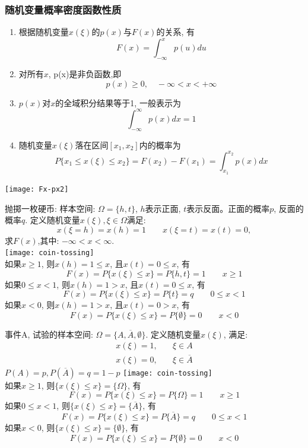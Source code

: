 \begin{frame}[shrink]
\frametitle{随机变量概率密度函数性质}
\begin{enumerate}
	\item 根据随机变量$x(\xi)$的$p(x)$与$F(x)$的关系, 有
	\[F(x)=\int_{-\infty}^{x}p(u)du\]
	\item 对所有$x$, p(x)是非负函数,即
	\[p(x)\ge 0,\quad -\infty<x<+\infty \]
	\item $p(x)$对$x$的全域积分结果等于1, 一般表示为
	\[\int_{-\infty}^{\infty}p(x)dx=1\]
	\item 随机变量$x(\xi)$落在区间$[x_1,x_2]$内的概率为
	\[P\{x_1\le x(\xi)\le x_2\}=F(x_2)-F(x_1)=\int_{x_1}^{x_2}p(x)dx\]
\end{enumerate}
\texttt{[image: Fx-px2]}
\end{frame}

\begin{frame}[shrink]
抛掷一枚硬币: 样本空间: $\Omega=\{h,t\}$, $h$表示正面, $t$表示反面。正面的概率$p$, 反面的概率$q$. 定义随机变量$x(\xi),\xi\in \Omega$满足:
	\[x(\xi=h)=x(h)=1\qquad x(\xi=t)=x(t)=0,\]
	求$F(x)$,其中: $-\infty<x<\infty$.\\
	\texttt{[image: coin-tossing]}\\
	如果$x\ge 1$, 则$x(h)=1\le x$, 且$x(t)=0\le x$, 有
	\[F(x)=P\{x(\xi)\le x \}=P\{h,t\}=1\qquad x\ge 1 \] 
    如果$0\le x<1$, 则$x(h)=1> x$, 且$x(t)=0\le x$, 有
    \[F(x)=P\{x(\xi)\le x \}=P\{t\}=q \qquad 0\le x<1 \] 
    如果$x<0$, 则$x(h)=1> x$, 且$x(t)=0> x$, 有
    \[F(x)=P\{x(\xi)\le x \}=P\{\emptyset\}=0 \qquad x<0 \] 
\end{frame}

\begin{frame}[shrink]
事件A, 试验的样本空间: $\Omega=\{A,\overline{A},\emptyset \}$. 定义随机变量$x(\xi)$,
满足:
\begin{align*}
	x(\xi)=1, &\quad \xi\in A\\
	x(\xi)=0, &\quad \xi\in\overline{A}
\end{align*}
$P(A)=p,P(\overline{A})=q=1-p$
\texttt{[image: coin-tossing]}\\
如果$x\ge 1$, 则$\{x(\xi)\le x\}=\{\Omega \}$, 有
\[F(x)=P\{x(\xi)\le x \}=P\{\Omega \}=1\qquad x\ge 1 \] 
如果$0\le x<1$, 则$\{x(\xi)\le x\}=\{\overline{A}\}$, 有
\[F(x)=P\{x(\xi)\le x \}=P\{\overline{A}\}=q \qquad 0\le x<1 \] 
如果$x<0$, 则$\{x(\xi)\le x\}=\{\emptyset\}$, 有
\[F(x)=P\{x(\xi)\le x \}=P\{\emptyset\}=0 \qquad x<0 \] 
\end{frame}

